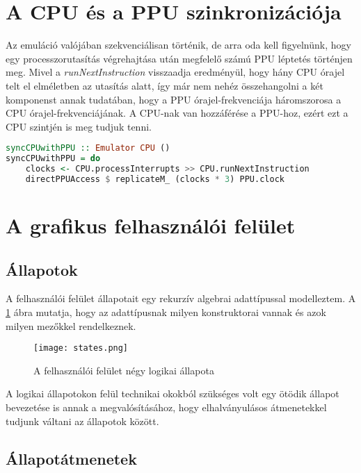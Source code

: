 \section{A CPU és a PPU szinkronizációja}
Az emuláció valójában szekvenciálisan történik, de arra oda kell figyelnünk, hogy egy processzorutasítás végrehajtása után megfelelő számú PPU léptetés történjen meg. Mivel a \emph{runNextInstruction} visszaadja eredményül, hogy hány CPU órajel telt el elméletben az utasítás alatt, így már nem nehéz összehangolni a két komponenst annak tudatában, hogy a PPU órajel-frekvenciája háromszorosa a CPU órajel-frekvenciájának.
A CPU-nak van hozzáférése a PPU-hoz, ezért ezt a CPU szintjén is meg tudjuk tenni.
\vspace{0.3cm}
\begin{lstlisting}[language=Haskell, basicstyle=\scriptsize]
syncCPUwithPPU :: Emulator CPU ()
syncCPUwithPPU = do
	clocks <- CPU.processInterrupts >> CPU.runNextInstruction
	directPPUAccess $ replicateM_ (clocks * 3) PPU.clock
\end{lstlisting}

\section{A grafikus felhasználói felület}
\label{lab:gui}

\subsection{Állapotok}

A felhasználói felület állapotait egy rekurzív algebrai adattípussal modelleztem. A \ref{fig:guistate} ábra mutatja, hogy az adattípusnak milyen konstruktorai vannak és azok milyen mezőkkel rendelkeznek.

\begin{figure}[H]
	\centering
	\texttt{[image: states.png]}
	\caption{A felhasználói felület négy logikai állapota}
	\label{fig:guistate}
\end{figure}

A logikai állapotokon felül technikai okokból szükséges volt egy ötödik állapot bevezetése is annak a megvalósításához, hogy elhalványulásos átmenetekkel tudjunk váltani az állapotok között.

\subsection{Állapotátmenetek}

